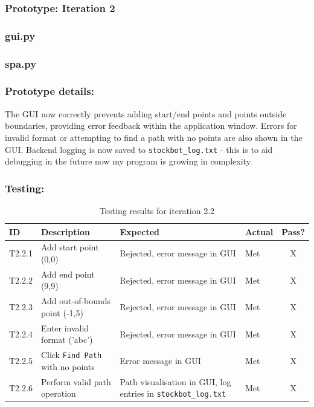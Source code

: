 \subsubsection*{Prototype: Iteration 2}
\subsubsection{gui.py}


\newpage

\subsubsection{spa.py}


\newpage %

\subsubsection{Prototype details:}
The GUI now correctly prevents adding start/end points and points outside boundaries, providing error feedback within the application window. Errors for invalid format or attempting to find a path with no points are also shown in the GUI. Backend logging is now saved to \verb|stockbot_log.txt| - this is to aid debugging in the future now my program is growing in complexity.

\subsubsection{Testing:}
\begin{table}[htbp]
	\centering
	\begin{tabularx}{\textwidth}{|l|X|p{4.5cm}|p{1.5cm}|c|}
		\hline
		\textbf{ID} & \textbf{Description} & \textbf{Expected} & \textbf{Actual} & \textbf{Pass?} \\
		\hline
		T2.2.1 & Add start point (0,0) & Rejected, error message in GUI & Met & X \\
		\hline
		T2.2.2 & Add end point (9,9) & Rejected, error message in GUI & Met & X \\
		\hline
		T2.2.3 & Add out-of-bounds point (-1,5) & Rejected, error message in GUI & Met & X \\
		\hline
		T2.2.4 & Enter invalid format ('abc') & Rejected, error message in GUI & Met & X \\
		\hline
		T2.2.5 & Click \verb|Find Path| with no points & Error message in GUI & Met & X \\
		\hline
		T2.2.6 & Perform valid path operation & Path visualisation in GUI, log entries in \verb|stockbot_log.txt| & Met & X \\
		\hline
	\end{tabularx}
	\caption{Testing results for iteration 2.2}
\end{table}

